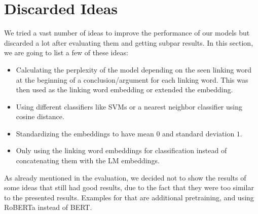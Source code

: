 \section{Discarded Ideas}
We tried a vast number of ideas to improve the performance of our models but discarded a lot after evaluating them and getting subpar results. In this section, we are going to list a few of these ideas:

\begin{itemize}
	\item Calculating the perplexity of the model depending on the seen linking word at the beginning of a conclusion/argument 			  for each linking word. This was then used as the linking word embedding or extended the embedding.
	\item Using different classifiers like SVMs or a nearest neighbor classifier using cosine distance.
	\item Standardizing the embeddings to have mean $0$ and standard deviation $1$.
	\item Only using the linking word embeddings for classification instead of concatenating them with the LM embeddings.
\end{itemize} 

As already mentioned in the evaluation, we decided not to show the results of some ideas that still had good results, due to the fact that they were too similar to the presented results. Examples for that are additional pretraining, and using RoBERTa instead of BERT.